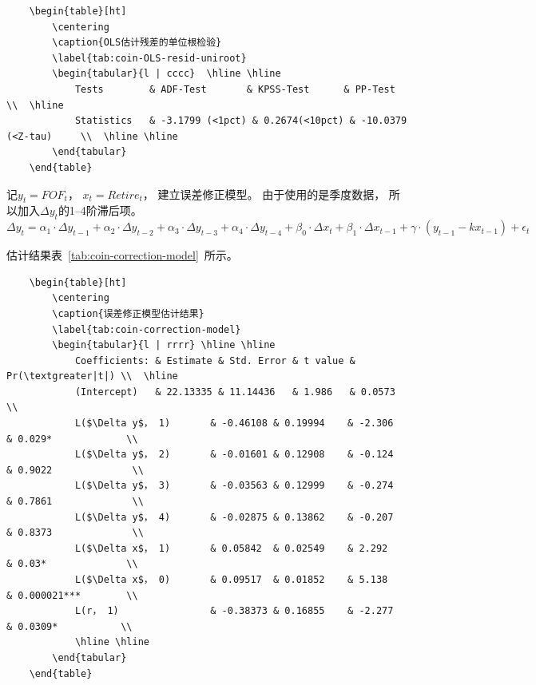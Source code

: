 \begin{lstlisting}
    \begin{table}[ht]
        \centering
        \caption{OLS估计残差的单位根检验}
        \label{tab:coin-OLS-resid-uniroot}
        \begin{tabular}{l | cccc}  \hline \hline
            Tests        & ADF-Test       & KPSS-Test      & PP-Test               \\  \hline
            Statistics   & -3.1799 (<1pct) & 0.2674(<10pct) & -10.0379 (<Z-tau)     \\  \hline \hline
        \end{tabular}
    \end{table}
\end{lstlisting}

记$y_t = FOF_t$， $x_t = Retire_t$， 建立误差修正模型。 由于使用的是季度数据， 所以加入$\Delta y_t$的1--4阶滞后项。
$$
\Delta y_t = \alpha_1 \cdot \Delta y_{t-1} + \alpha_2  \cdot \Delta  y_{t-2} + \alpha_3 \cdot \Delta  y_{t-3} + \alpha_4 \cdot \Delta  y_{t-4} + \beta_0 \cdot \Delta  x_t+\beta_1 \cdot \Delta  x_{t-1} + \gamma \cdot ( y_{t-1}-kx_{t-1}) + \epsilon_t
$$


估计结果表~\ref{tab:coin-correction-model}~所示。

\begin{lstlisting}
    \begin{table}[ht]
        \centering
        \caption{误差修正模型估计结果}
        \label{tab:coin-correction-model}
        \begin{tabular}{l | rrrr} \hline \hline
            Coefficients: & Estimate & Std. Error & t value & Pr(\textgreater|t|) \\  \hline
            (Intercept)   & 22.13335 & 11.14436   & 1.986   & 0.0573              \\
            L($\Delta y$， 1)       & -0.46108 & 0.19994    & -2.306  & 0.029*             \\
            L($\Delta y$， 2)       & -0.01601 & 0.12908    & -0.124  & 0.9022              \\
            L($\Delta y$， 3)       & -0.03563 & 0.12999    & -0.274  & 0.7861              \\
            L($\Delta y$， 4)       & -0.02875 & 0.13862    & -0.207  & 0.8373              \\
            L($\Delta x$， 1)       & 0.05842  & 0.02549    & 2.292   & 0.03*              \\
            L($\Delta x$， 0)       & 0.09517  & 0.01852    & 5.138   & 0.000021***        \\
            L(r， 1)                & -0.38373 & 0.16855    & -2.277  & 0.0309*           \\ 
            \hline \hline
        \end{tabular}
    \end{table}
\end{lstlisting}


